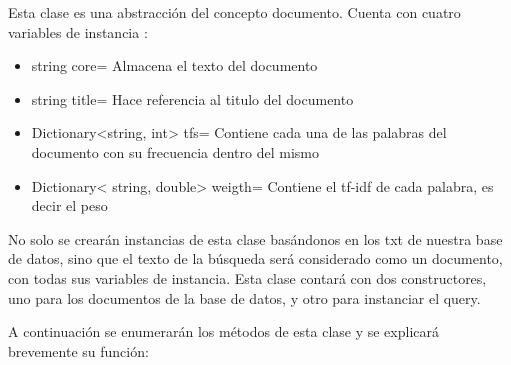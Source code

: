 \documentclass[12pt]{article}
\begin{document}
Esta clase es una abstracci\'on del concepto documento. Cuenta con cuatro variables de instancia :

\begin{itemize}
	\item string  core= Almacena el texto del documento
	\item string title= Hace referencia al titulo del documento
	\item Dictionary<string, int> tfs= Contiene cada una de las palabras del documento con su frecuencia             
     	dentro del mismo
    \item Dictionary< string, double> weigth= Contiene el tf-idf de cada palabra, es decir el peso    
\end{itemize}
   

No solo se crear\'an instancias de esta clase bas\'andonos en los txt de nuestra base de datos, sino que el texto de la b\'usqueda ser\'a considerado como un documento, con todas sus variables de instancia.
Esta clase contar\'a con dos constructores, uno para los documentos de la base de datos, y otro para instanciar el query.

 A continuaci\'on se enumerar\'an los m\'etodos de esta clase y se explicar\'a brevemente su funci\'on:
 
\end{document}
